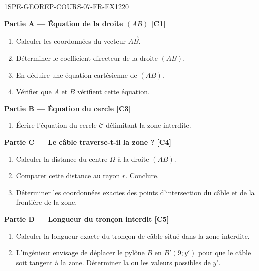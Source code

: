 \begin{exercice}{1SPE-GEOREP-COURS-07-FR-EX1}{2}{20}

\textbf{Partie A — Équation de la droite $(AB)$ \hfill [C1]}

\begin{enumerate}
  \item Calculer les coordonnées du vecteur $\vec{AB}$.
  \item Déterminer le coefficient directeur de la droite $(AB)$.
  \item En déduire une équation cartésienne de $(AB)$.
  \item Vérifier que $A$ et $B$ vérifient cette équation.
\end{enumerate}

\textbf{Partie B — Équation du cercle \hfill [C3]}

\begin{enumerate}[resume]
  \item Écrire l'équation du cercle $\mathcal{C}$ délimitant la zone interdite.
\end{enumerate}

\textbf{Partie C — Le câble traverse-t-il la zone ? \hfill [C4]}

\begin{enumerate}[resume]
  \item Calculer la distance du centre $\Omega$ à la droite $(AB)$.
  \item Comparer cette distance au rayon $r$. Conclure.
  \item Déterminer les coordonnées exactes des points d'intersection du câble et de la frontière de la zone.
\end{enumerate}

\textbf{Partie D — Longueur du tronçon interdit \hfill [C5]}

\begin{enumerate}[resume]
  \item Calculer la longueur exacte du tronçon de câble situé dans la zone interdite.
  \item L'ingénieur envisage de déplacer le pylône $B$ en $B'(9 ; y')$ pour que le câble soit tangent à la zone. Déterminer la ou les valeurs possibles de $y'$.
\end{enumerate}

\end{exercice}
